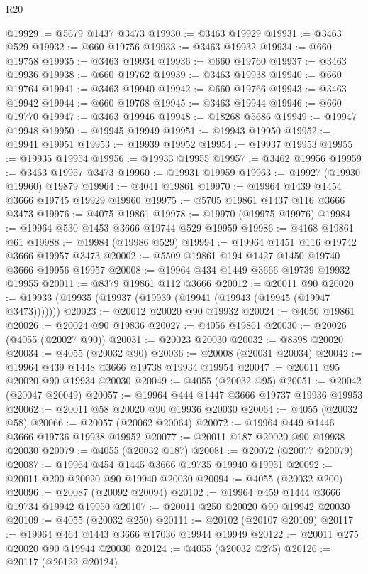 \begin{lexlean}{R20}
\begin{coremodule}
@19929 := @5679 @1437 @3473
@19930 := @3463 @19929
@19931 := @3463 @529
@19932 := @660 @19756
@19933 := @3463 @19932
@19934 := @660 @19758
@19935 := @3463 @19934
@19936 := @660 @19760
@19937 := @3463 @19936
@19938 := @660 @19762
@19939 := @3463 @19938
@19940 := @660 @19764
@19941 := @3463 @19940
@19942 := @660 @19766
@19943 := @3463 @19942
@19944 := @660 @19768
@19945 := @3463 @19944
@19946 := @660 @19770
@19947 := @3463 @19946
@19948 := @18268 @5686
@19949 := @19947 @19948
@19950 := @19945 @19949
@19951 := @19943 @19950
@19952 := @19941 @19951
@19953 := @19939 @19952
@19954 := @19937 @19953
@19955 := @19935 @19954
@19956 := @19933 @19955
@19957 := @3462 @19956
@19959 := @3463 @19957 @3473
@19960 := @19931 @19959
@19963 := @19927 (@19930 @19960) @19879
@19964 := @4041 @19861
@19970 := @19964 @1439 @1454 @3666 @19745 @19929 @19960
@19975 := @5705 @19861 @1437 @116 @3666 @3473
@19976 := @4075 @19861
@19978 := @19970 (@19975 @19976)
@19984 := @19964 @530 @1453 @3666 @19744 @529 @19959
@19986 := @4168 @19861 @61
@19988 := @19984 (@19986 @529)
@19994 := @19964 @1451 @116 @19742 @3666 @19957 @3473
@20002 := @5509 @19861 @194 @1427 @1450 @19740 @3666 @19956 @19957
@20008 := @19964 @434 @1449 @3666 @19739 @19932 @19955
@20011 := @8379 @19861 @112 @3666
@20012 := @20011 @90
@20020 := @19933 (@19935 (@19937 (@19939 (@19941 (@19943 (@19945 (@19947 @3473)))))))
@20023 := @20012 @20020 @90 @19932
@20024 := @4050 @19861
@20026 := @20024 @90 @19836
@20027 := @4056 @19861
@20030 := @20026 (@4055 (@20027 @90))
@20031 := @20023 @20030
@20032 := @8398 @20020
@20034 := @4055 (@20032 @90)
@20036 := @20008 (@20031 @20034)
@20042 := @19964 @439 @1448 @3666 @19738 @19934 @19954
@20047 := @20011 @95 @20020 @90 @19934 @20030
@20049 := @4055 (@20032 @95)
@20051 := @20042 (@20047 @20049)
@20057 := @19964 @444 @1447 @3666 @19737 @19936 @19953
@20062 := @20011 @58 @20020 @90 @19936 @20030
@20064 := @4055 (@20032 @58)
@20066 := @20057 (@20062 @20064)
@20072 := @19964 @449 @1446 @3666 @19736 @19938 @19952
@20077 := @20011 @187 @20020 @90 @19938 @20030
@20079 := @4055 (@20032 @187)
@20081 := @20072 (@20077 @20079)
@20087 := @19964 @454 @1445 @3666 @19735 @19940 @19951
@20092 := @20011 @200 @20020 @90 @19940 @20030
@20094 := @4055 (@20032 @200)
@20096 := @20087 (@20092 @20094)
@20102 := @19964 @459 @1444 @3666 @19734 @19942 @19950
@20107 := @20011 @250 @20020 @90 @19942 @20030
@20109 := @4055 (@20032 @250)
@20111 := @20102 (@20107 @20109)
@20117 := @19964 @464 @1443 @3666 @17036 @19944 @19949
@20122 := @20011 @275 @20020 @90 @19944 @20030
@20124 := @4055 (@20032 @275)
@20126 := @20117 (@20122 @20124)

\end{coremodule}
\end{lexlean}
